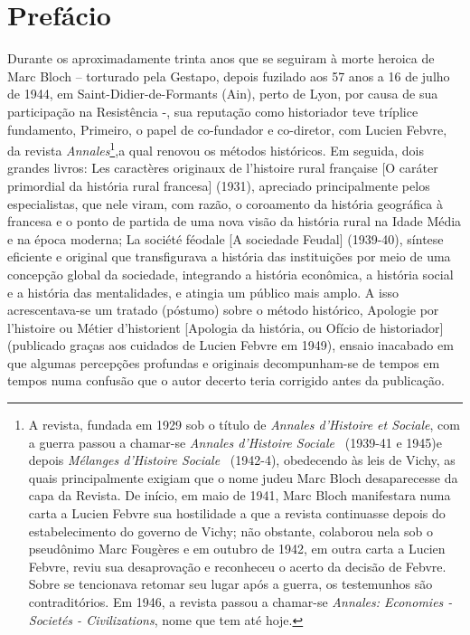 \documentclass[a5paper]{book}
\begin{document}
\chapter{Prefácio}
Durante os aproximadamente trinta anos que se seguiram à morte heroica de Marc Bloch – torturado pela Gestapo, depois fuzilado aos 57 anos a 16 de julho de 1944, em Saint-Didier-de-Formants (Ain), perto de Lyon, por causa de sua participação na Resistência -, sua reputação como historiador teve tríplice fundamento, Primeiro, o papel de co-fundador e co-diretor, com Lucien Febvre, da revista \emph{Annales}\footnote{A revista, fundada em 1929 sob o título de \emph{\foreignlanguage{french}{Annales d'Histoire et Sociale}}, com a guerra passou a chamar-se \emph{\foreignlanguage{french}{Annales d'Histoire Sociale}} ~(1939-41 e 1945)e depois \emph{Mélanges d'Histoire Sociale} ~(1942-4), obedecendo às leis de Vichy, as quais principalmente exigiam que o nome judeu Marc Bloch desaparecesse da capa da Revista. De início, em maio de 1941, Marc Bloch manifestara numa carta a Lucien Febvre sua hostilidade a que a revista continuasse depois do estabelecimento do governo de Vichy; não obstante, colaborou nela sob o pseudônimo Marc Fougères e em outubro de 1942, em outra carta a Lucien Febvre, reviu sua desaprovação e reconheceu o acerto da decisão de Febvre. Sobre se tencionava retomar seu lugar após a guerra, os testemunhos são contraditórios. Em 1946, a revista passou a chamar-se \emph{Annales: Economies - Societés - Civilizations}, nome que tem até hoje.},a qual renovou os métodos históricos. Em seguida, dois grandes livros: \foreignlanguage{french}{Les caractères originaux de l’histoire rural française} [O caráter primordial da história rural francesa] (1931), apreciado principalmente pelos especialistas, que nele viram, com razão, o coroamento da história geográfica à francesa e o ponto de partida de uma nova visão da história rural na Idade Média e na época moderna; La société féodale [A sociedade Feudal] (1939-40), síntese eficiente e original que transfigurava a história das instituições por meio de uma concepção global da sociedade, integrando a história econômica, a história social e a história das mentalidades, e atingia um público mais amplo. A isso acrescentava-se um tratado (póstumo) sobre o método histórico, Apologie por l’histoire ou Métier d’historient [Apologia da história, ou Ofício de historiador] (publicado graças aos cuidados de Lucien Febvre em 1949), ensaio inacabado em que algumas percepções profundas e originais decompunham-se de tempos em tempos numa confusão que o autor decerto teria corrigido antes da publicação.
\end{document}
